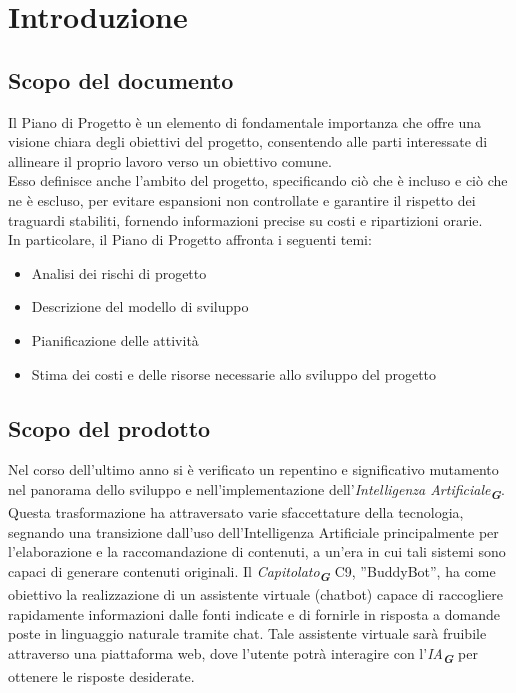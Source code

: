 

\section{Introduzione}
\label{sec:introduzione}

\subsection{Scopo del documento}
Il Piano di Progetto è un elemento di fondamentale importanza che offre una visione chiara degli obiettivi del progetto, 
consentendo alle parti interessate di allineare il proprio lavoro verso un obiettivo comune.\\
Esso definisce anche l'ambito del progetto, specificando ciò che è incluso e ciò che ne è escluso, per evitare espansioni 
non controllate e garantire il rispetto dei traguardi stabiliti, fornendo informazioni precise su costi e ripartizioni orarie.\\
In particolare, il Piano di Progetto affronta i seguenti temi:
\begin{itemize}
    \item Analisi dei rischi di progetto
    \item Descrizione del modello di sviluppo
    \item Pianificazione delle attività
    \item Stima dei costi e delle risorse necessarie allo sviluppo del progetto
\end{itemize}

\subsection{Scopo del prodotto}
Nel corso dell’ultimo anno si è verificato un repentino e significativo mutamento nel panorama dello sviluppo e nell’implementazione dell’\emph{Intelligenza Artificiale}\textsubscript{\textit{\textbf{G}}}. Questa trasformazione ha attraversato varie sfaccettature della tecnologia, segnando una transizione dall’uso dell’Intelligenza Artificiale principalmente per l’elaborazione e la raccomandazione di contenuti, a un’era in cui tali sistemi sono capaci di generare contenuti originali.
Il \emph{Capitolato}\textsubscript{\textit{\textbf{G}}} C9, ”BuddyBot”, ha come obiettivo la realizzazione di un assistente virtuale (chatbot) capace di raccogliere rapidamente informazioni dalle fonti indicate e di fornirle in risposta a domande poste in linguaggio naturale tramite chat.
Tale assistente virtuale sarà fruibile attraverso una piattaforma web, dove l’utente potrà interagire con l'\emph{IA}\textsubscript{\textit{\textbf{G}}} per ottenere le risposte desiderate.

